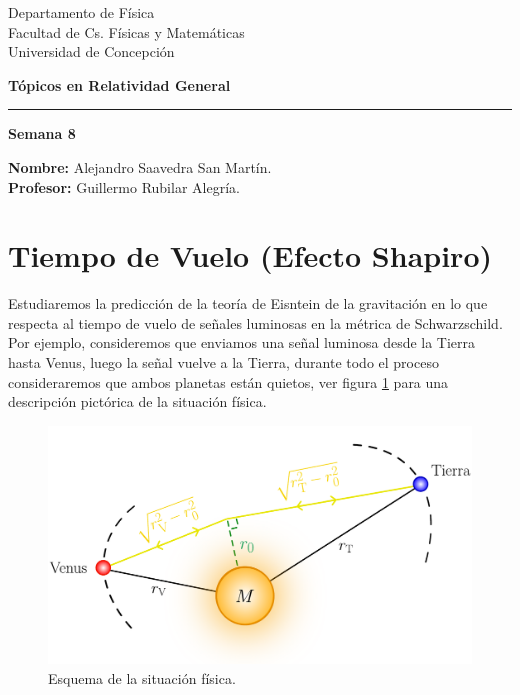 \documentclass[letterpaper,11pt]{article}
\begin{document}
\pagestyle{plain}

\begin{flushleft}\vspace{-2cm}
Departamento de Física \\
Facultad de Cs. Físicas y Matemáticas\\
Universidad de Concepción
\end{flushleft}

\begin{flushright}\vspace{-1.5cm}
\textbf{Tópicos en Relatividad General} 
\end{flushright}



\rule{\linewidth}{0.1mm}

\begin{center}
\textbf{\LARGE Semana 8}
\end{center}

\begin{flushleft}
\textbf{Nombre:} Alejandro Saavedra San Martín. \\
\textbf{Profesor:} Guillermo Rubilar Alegría.
\end{flushleft}

\section*{Tiempo de Vuelo (Efecto Shapiro)}

Estudiaremos la predicción de la teoría de Eisntein de la gravitación en lo que respecta al tiempo de vuelo de señales luminosas en la métrica de Schwarzschild. Por ejemplo, consideremos que enviamos una señal luminosa desde la Tierra hasta Venus, luego la señal vuelve a la Tierra, durante todo el proceso consideraremos que ambos planetas están quietos, ver figura \ref{fig:Efecto-Shapiro} para una descripción pictórica de la situación física.

\begin{figure}[H]
    \centering
    \includegraphics[scale = 0.5]{Fig-Tiempo-Vuelo-1}
    \caption{Esquema de la situación física.}
    \label{fig:Efecto-Shapiro}
\end{figure}
\end{document}
